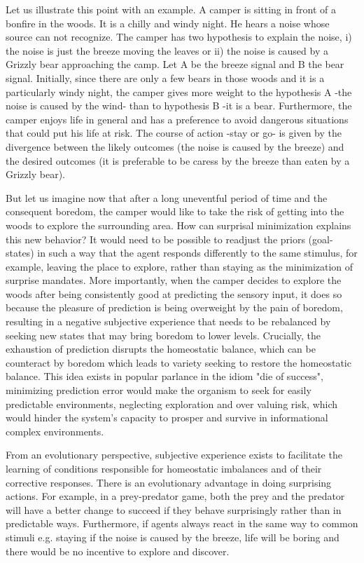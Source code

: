 \documentclass[11pt, onecolumn]{article}
\begin{document}
Let us illustrate this point with an example. A camper is sitting in front of a bonfire in the woods. It is a chilly and windy night. He hears a noise whose source can not recognize. The camper has two hypothesis to explain the noise, i) the noise is just the breeze moving the leaves or ii) the noise is caused by a Grizzly bear approaching the camp. Let A be the breeze signal and B the bear signal. Initially, since there are only a few bears in those woods and it is a particularly windy night, the camper gives more weight to the hypothesis A -the noise is caused by the wind- than to hypothesis B -it is a bear. Furthermore, the camper enjoys life in general and has a preference to avoid dangerous situations that could put his life at risk. The course of action -stay or go- is given by the divergence between the likely outcomes (the noise is caused by the breeze) and the desired outcomes (it is preferable to be caress by the breeze than eaten by a Grizzly bear). 

But let us imagine now that after a long uneventful period of time and the consequent boredom, the camper would like to take the risk of getting into the woods to explore the surrounding area. 
How can surprisal minimization explains this new behavior? It would need to be possible to readjust the priors (goal-states) in such a way that the agent responds differently to the same stimulus, for example, leaving the place to explore, rather than staying as the minimization of surprise mandates. 
More importantly, when the camper decides to explore the woods after being consistently good at predicting the sensory input, it does so because the pleasure of prediction is being overweight by the pain of boredom, resulting in a negative subjective experience that needs to be rebalanced by seeking new states that may bring boredom to lower levels. 
Crucially, the exhaustion of prediction disrupts the homeostatic balance, which can be counteract by boredom which leads to variety seeking to restore the homeostatic balance. This idea exists in popular parlance in the idiom "die of success", minimizing prediction error would make the organism to seek for easily predictable environments, neglecting exploration and over valuing risk, which would hinder the system's capacity to prosper and survive in informational complex environments. 

From an evolutionary perspective, subjective experience exists to facilitate
the learning of conditions responsible for homeostatic imbalances and
of their corrective responses. There is an evolutionary advantage in doing
surprising actions. For example, in a prey-predator game, both the prey and
the predator will have a better change to succeed if they behave surprisingly
rather than in predictable ways. Furthermore, if agents always react in the
same way to common stimuli e.g. staying if the noise is caused by the breeze, life will be boring and there would be no incentive to explore and discover.
\end{document}
